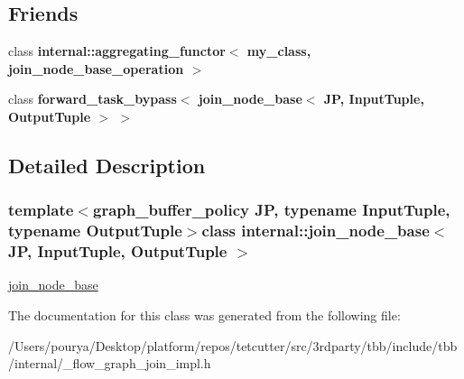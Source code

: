\subsection*{Friends}
\begin{DoxyCompactItemize}
\item 
\hypertarget{classinternal_1_1join__node__base_a6f2ee756c40232c8e349e1430e4c5c31}{}class {\bfseries internal\+::aggregating\+\_\+functor$<$ my\+\_\+class, join\+\_\+node\+\_\+base\+\_\+operation $>$}\label{classinternal_1_1join__node__base_a6f2ee756c40232c8e349e1430e4c5c31}

\item 
\hypertarget{classinternal_1_1join__node__base_a827e19a3db812b973b8d6650a9629a50}{}class {\bfseries forward\+\_\+task\+\_\+bypass$<$ join\+\_\+node\+\_\+base$<$ J\+P, Input\+Tuple, Output\+Tuple $>$ $>$}\label{classinternal_1_1join__node__base_a827e19a3db812b973b8d6650a9629a50}

\end{DoxyCompactItemize}


\subsection{Detailed Description}
\subsubsection*{template$<$graph\+\_\+buffer\+\_\+policy J\+P, typename Input\+Tuple, typename Output\+Tuple$>$class internal\+::join\+\_\+node\+\_\+base$<$ J\+P, Input\+Tuple, Output\+Tuple $>$}

\hyperlink{classinternal_1_1join__node__base}{join\+\_\+node\+\_\+base} 

The documentation for this class was generated from the following file\+:\begin{DoxyCompactItemize}
\item 
/\+Users/pourya/\+Desktop/platform/repos/tetcutter/src/3rdparty/tbb/include/tbb/internal/\+\_\+flow\+\_\+graph\+\_\+join\+\_\+impl.\+h\end{DoxyCompactItemize}
